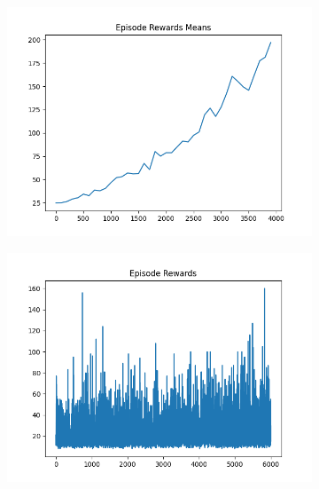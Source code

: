 \begin{figure}[H]
    \centering
    \begin{subfigure}{.47\linewidth}
        \centering
        \includegraphics[width=\textwidth]{pole/2024-06-14_15-38-10_dqn_cartpole_episode_rewards_means.png}
    \end{subfigure}
    \begin{subfigure}{.47\linewidth}
        \centering
        \includegraphics[width=\textwidth]{pole/2024-06-14_17-31-42_dqn_cartpole_episode_rewards.png}
    \end{subfigure}
    \begin{subfigure}{.47\linewidth}
        \centering

\end{subfigure}
\end{figure}
